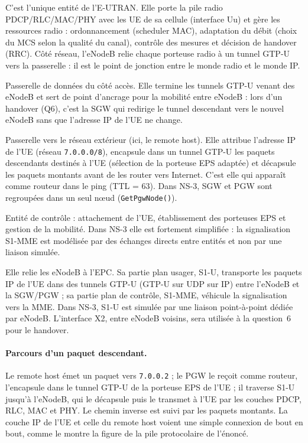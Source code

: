 \begin{description}[style=nextline, leftmargin=1.2em, itemsep=4pt]
\item[eNodeB (station de base).] C'est l'unique entité de l'E-UTRAN. Elle porte
la pile radio PDCP/RLC/MAC/PHY avec les UE de sa cellule (interface Uu) et gère
les ressources radio : ordonnancement (scheduler MAC), adaptation du débit
(choix du MCS selon la qualité du canal), contrôle des mesures et décision de
handover (RRC). Côté réseau, l'eNodeB relie chaque porteuse radio à un tunnel
GTP-U vers la passerelle : il est le point de jonction entre le monde radio et
le monde IP.

\item[SGW (Serving Gateway).] Passerelle de données du côté accès. Elle termine
les tunnels GTP-U venant des eNodeB et sert de point d'ancrage pour la mobilité
entre eNodeB : lors d'un handover (Q6), c'est la SGW qui redirige le tunnel
descendant vers le nouvel eNodeB sans que l'adresse IP de l'UE ne change.

\item[PGW (PDN Gateway).] Passerelle vers le réseau extérieur (ici, le remote
host). Elle attribue l'adresse IP de l'UE (réseau \texttt{7.0.0.0/8}),
encapsule dans un tunnel GTP-U les paquets descendants destinés à l'UE
(sélection de la porteuse EPS adaptée) et décapsule les paquets montants avant
de les router vers Internet. C'est elle qui apparaît comme routeur dans le
ping (TTL = 63). Dans NS-3, SGW et PGW sont regroupées dans un seul n\oe ud
(\texttt{GetPgwNode()}).

\item[MME (Mobility Management Entity).] Entité de contrôle : attachement de
l'UE, établissement des porteuses EPS et gestion de la mobilité. Dans NS-3 elle
est fortement simplifiée : la signalisation S1-MME est modélisée par des
échanges directs entre entités et non par une liaison simulée.

\item[Interface S1.] Elle relie les eNodeB à l'EPC. Sa partie plan usager,
S1-U, transporte les paquets IP de l'UE dans des tunnels GTP-U (GTP-U sur UDP
sur IP) entre l'eNodeB et la SGW/PGW ; sa partie plan de contrôle, S1-MME,
véhicule la signalisation vers la MME. Dans NS-3, S1-U est simulée par une
liaison point-à-point dédiée par eNodeB. L'interface X2, entre eNodeB voisins,
sera utilisée à la question~6 pour le handover.
\end{description}

\paragraph{Parcours d'un paquet descendant.} Le remote host émet un paquet vers
\texttt{7.0.0.2} ; le PGW le reçoit comme routeur, l'encapsule dans le tunnel
GTP-U de la porteuse EPS de l'UE ; il traverse S1-U jusqu'à l'eNodeB, qui le
décapsule puis le transmet à l'UE par les couches PDCP, RLC, MAC et PHY.
Le chemin inverse est suivi par les paquets montants. La couche IP de l'UE et
celle du remote host voient une simple connexion de bout en bout, comme le
montre la figure de la pile protocolaire de l'énoncé.

